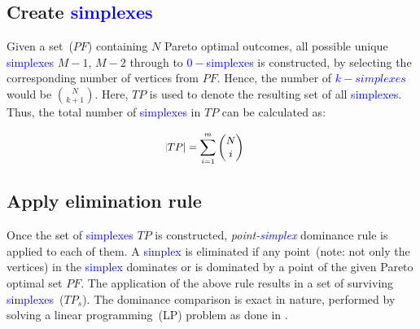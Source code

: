 \subsection{Create \textcolor{blue}{simplexes}} Given a set~($PF$) containing $N$ Pareto optimal outcomes, all possible unique \textcolor{blue}{simplexes}  $M-1$, $M-2$ through to \textcolor{blue}{$0-$simplexes} is constructed, by selecting the corresponding number of vertices from $PF$. Hence, the number of \textcolor{blue}{$k-simplexes$} would be $N\choose {k+1}$. Here, $TP$ is used to denote the resulting set of all \textcolor{blue}{simplexes}. Thus, the total number of \textcolor{blue}{simplexes} in $TP$ can be calculated as:

\begin{equation}\small
\begin{aligned}
&\hspace{-1.5em}\left|TP\right| = \sum_{i = 1}^m{N\choose i}\\
\label{eqn:NP}
\end{aligned}
\end{equation}

\subsection{Apply elimination rule} 
Once the set of \textcolor{blue}{simplexes} $TP$ is constructed, \emph{point-\textcolor{blue}{simplex}} dominance rule is applied to each of them. A \textcolor{blue}{simplex} is eliminated if any point~(note: not only the vertices) in the \textcolor{blue}{simplex} dominates or is dominated by a point of the given Pareto optimal set $PF$. The application of the above rule results in a set of surviving \textcolor{blue}{simplexes}~($TP_s$). {\color{blue}The dominance comparison is exact in nature, performed by solving a linear programming~(LP) problem as done in \cite{hartikainen2011constructing}}. 

